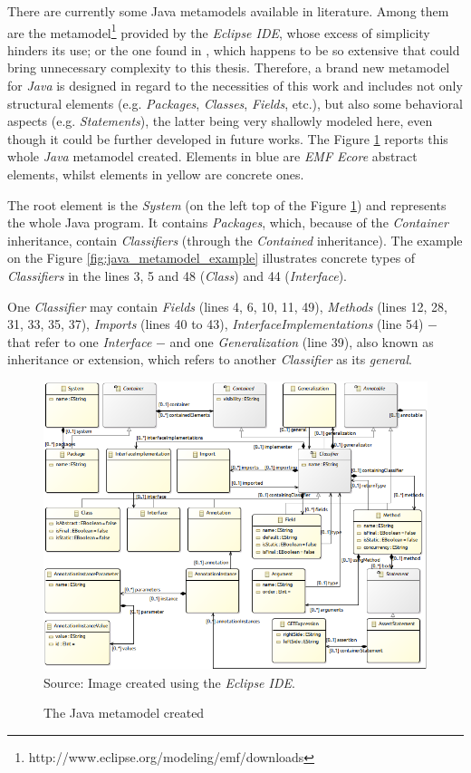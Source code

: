 \documentclass[tuberlin,cic,tc,english,noabntcite,oneside]{iiufrgs}
\begin{document}
There are currently some Java metamodels available in literature. Among them are the metamodel\footnote{http://www.eclipse.org/modeling/emf/downloads} provided by the \emph{Eclipse IDE}, whose excess of simplicity hinders its use; or the one found in \citet{heidenreich2010closing}, which happens to be so extensive that could bring unnecessary complexity to this thesis. Therefore, a brand new metamodel for \emph{Java} is designed in regard to the necessities of this work and includes not only structural elements (e.g. \emph{Packages}, \emph{Classes}, \emph{Fields}, etc.), but also some behavioral aspects (e.g. \emph{Statements}), the latter being very shallowly modeled here, even though it could be further developed in future works. The Figure \ref{fig:java_metamodel} reports this whole \emph{Java} metamodel created. Elements in blue are \emph{EMF Ecore} abstract elements, whilst elements in yellow are concrete ones.

The root element is the \emph{System} (on the left top of the Figure \ref{fig:java_metamodel}) and represents the whole Java program. It contains \emph{Packages}, which, because of the \emph{Container} inheritance, contain \emph{Classifiers} (through the \emph{Contained} inheritance). The example on the Figure \ref{fig:java_metamodel_example} illustrates concrete types of \emph{Classifiers} in the lines 3, 5 and 48 (\emph{Class}) and 44 (\emph{Interface}).

One \emph{Classifier} may contain \emph{Fields} (lines 4, 6, 10, 11, 49), \emph{Methods} (lines 12, 28, 31, 33, 35, 37), \emph{Imports} (lines 40 to 43), \emph{InterfaceImplementations} (line 54) $-$ that refer to one \emph{Interface} $-$ and one \emph{Generalization} (line 39), also known as inheritance or extension, which refers to another \emph{Classifier} as its \emph{general}.

\begin{figure}[H]
	\centering
    \caption{The Java metamodel created}
    \includegraphics[width=\textwidth]{javaMetamodel} \\
    Source: Image created using the \emph{Eclipse IDE}.
    \label{fig:java_metamodel}
\end{figure}
\end{document}
